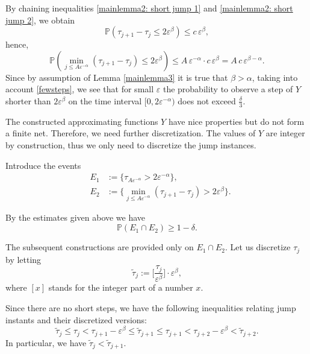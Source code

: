 \documentclass[12pt]{article}
\let\al\alpha
\let\de\delta
\let\ep\varepsilon
\newcommand{\prob}{\mathbb{P}}
\let\le\leqslant
\let\ge\geqslant
\theoremstyle{definition}
\begin{document}
By chaining inequalities \eqref{mainlemma2: short jump 1} and \eqref{mainlemma2: short jump 2}, 
we obtain
\begin{equation*}
            \prob(\tau_{j+1} - \tau_j \le 2 \ep^\beta)\le c\, \ep^\beta,
\end{equation*}
hence,
\begin{equation*}
    \prob \left(\min_{j\le A\ep^{-\al}}(\tau_{j+1}-\tau_j)\le 2\ep^\beta\right) 
    \le A \, \ep^{-\alpha} \cdot c \, \ep^{\beta} 
    = A\, c \, \ep^{\beta-\alpha}. 
\end{equation*}
Since by assumption of Lemma \ref{mainlemma3} it is true that $\beta > \alpha$, taking into account
\eqref{fewsteps},   we see that for small $\ep$ the probability to observe a step of $Y$ shorter than 
$2\ep^\beta$  on the time interval $[0,2\ep^{-\alpha})$ does not exceed $\frac{\de}{3}$.
\medskip

The constructed approximating functions $Y$ have nice properties but do not form a finite net.
Therefore, we need further discretization.  The values of $Y$ are integer by construction, thus we 
only need to discretize the jump instances.
        
Introduce the events
\begin{eqnarray*}
            &E_1& :=\{\tau_{A\ep^{-\alpha}}> 2\ep^{-\alpha}\},
\\
            &E_2&:=\{\min_{j\le A\ep^{-\al}}(\tau_{j+1}-\tau_j)> 2\ep^\beta\}.
\end{eqnarray*}
     
By the estimates given above we have
\begin{equation}\label{mainlemma3: two conditions}
            \prob(E_1\cap E_2) \ge 1 - \de.
\end{equation}

The subsequent constructions are provided only on $E_1\cap E_2$.
Let us discretize $\tau_j$ by letting 
\[   
    \tilde \tau_j:=\Big[\frac{\tau_j}{\ep^\beta}\Big] \cdot \ep^\beta, 
\]
where $[x]$ stands for the integer part of a number $x$.

Since there are no short steps, we have the following inequalities relating
jump instants and their discretized versions:
\begin{equation} \label{chaintau}
   \tilde \tau_j \le \tau_j < \tau_{j+1}-\ep^\beta \le \tilde \tau_{j+1} 
   \le \tau_{j+1} <\tau_{j+2}-\ep^\beta
   < \tilde\tau_{j+2}.
\end{equation}
In particular, we have $\tilde\tau_{j} < \tilde\tau_{j+1}$.
\end{document}
